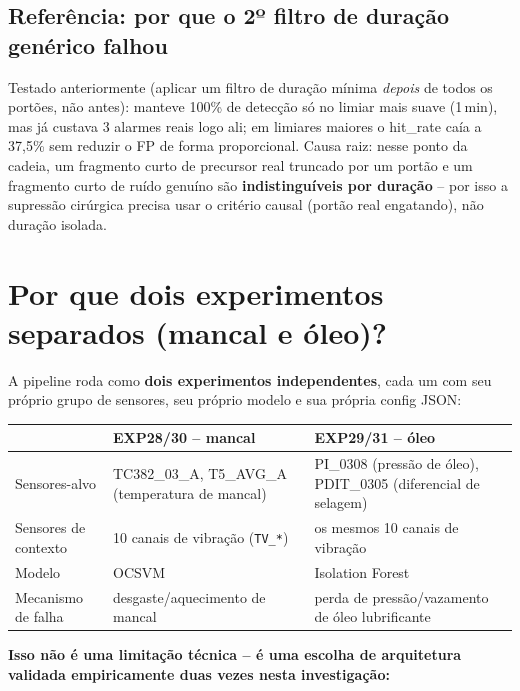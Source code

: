 \documentclass[11pt,a4paper]{article}
\begin{document}
\subsection*{Referência: por que o 2º filtro de duração genérico falhou}
\label{sec:2ofiltro}
Testado anteriormente (aplicar um filtro de duração mínima
\emph{depois} de todos os portões, não antes): manteve 100\% de
detecção só no limiar mais suave (1\,min), mas já custava 3 alarmes
reais logo ali; em limiares maiores o hit\_rate caía a 37,5\% sem
reduzir o FP de forma proporcional. Causa raiz: nesse ponto da cadeia,
um fragmento curto de precursor real truncado por um portão e um
fragmento curto de ruído genuíno são \textbf{indistinguíveis por
duração} -- por isso a supressão cirúrgica precisa usar o critério
causal (portão real engatando), não duração isolada.

\section{Por que dois experimentos separados (mancal e óleo)?}
\label{sec:porque-dois-experimentos}

A pipeline roda como \textbf{dois experimentos independentes}, cada um
com seu próprio grupo de sensores, seu próprio modelo e sua própria
config JSON:

\begin{table}[H]
\centering
\small
\begin{tabular}{p{3cm}p{5.7cm}p{5.7cm}}
\toprule
& \textbf{EXP28/30 -- mancal} & \textbf{EXP29/31 -- óleo} \\
\midrule
Sensores-alvo & TC382\_03\_A, T5\_AVG\_A (temperatura de mancal) & PI\_0308 (pressão de óleo), PDIT\_0305 (diferencial de selagem) \\
Sensores de contexto & 10 canais de vibração (\texttt{TV\_*}) & os mesmos 10 canais de vibração \\
Modelo & OCSVM & Isolation Forest \\
Mecanismo de falha & desgaste/aquecimento de mancal & perda de pressão/vazamento de óleo lubrificante \\
\bottomrule
\end{tabular}
\end{table}

\textbf{Isso não é uma limitação técnica -- é uma escolha de
arquitetura validada empiricamente duas vezes nesta investigação:}
\end{document}
